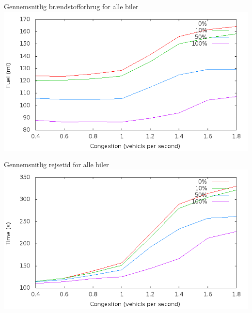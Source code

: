 \begin{frame}{Gennemsnitlig brændstofforbrug for alle biler}
\includegraphics[width=1\textwidth]{../images/fuelCongestion.png}
\end{frame}

\begin{frame}{Gennemsnitlig rejsetid for alle biler}
\includegraphics[width=1\textwidth]{../images/timeCongestion.png}
\end{frame}


